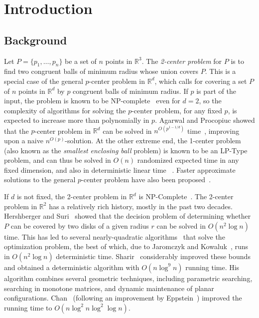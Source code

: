 \documentclass[a4paper,12pt]{article}
\def\reals{\mathbb{R}}
\begin{document}
\section{Introduction}
\label{sec:introduction}

\subsection{Background}
\label{subsec:background} Let $P = \{p_1,\ldots,p_n\}$ be a set of
$n$ points in $\reals^3$. The \emph{2-center problem} for $P$ is to
find two congruent balls of minimum radius whose union covers $P$.
This is a special case of the general $p$-center problem in
$\reals^d$, which calls for covering a set $P$ of $n$ points in
$\mathbb{R}^d$ by $p$ congruent balls of minimum radius. If $p$ is
part of the input, the problem is known to be NP-complete~\cite{MK}
even for $d=2$, so the complexity of algorithms for solving the
$p$-center problem, for any fixed $p$, is expected to increase more
than polynomially in $p$. Agarwal and Procopiuc showed that the
$p$-center problem in $\reals^d$ can be solved in $n^{O(p^{1-1/d})}$
time~\cite{AP}, improving upon a naive $n^{O(p)}$-solution. At the
other extreme end, the 1-center problem (also known as the
\emph{smallest enclosing ball} problem) is known to be an LP-Type
problem, and can thus be solved in $O(n)$ randomized expected time
in any fixed dimension, and also in deterministic linear time
~\cite{CM, NML, NMLT}. Faster approximate solutions to the general
$p$-center problem have also been proposed~\cite{AP, BHI, BE}.

If $d$ is not fixed, the 2-center problem in $\reals^d$ is
NP-Complete~\cite{MK2}. The 2-center problem in $\reals^2$ has a
relatively rich history, mostly in the past two decades. Hershberger
and Suri~\cite{HS} showed that the decision problem of determining
whether $P$ can be covered by two disks of a given radius $r$ can be
solved in $O(n^2 \log n)$ time. This has led to several
nearly-quadratic algorithms~\cite{ASP, DE, JK} that solve the
optimization problem, the best of which, due to Jaromczyk and
Kowaluk~\cite{JK}, runs in $O(n^2 \log n)$ deterministic time.
Sharir~\cite{MS} considerably improved these bounds and obtained a
deterministic algorithm with $O(n \log^9 n)$ running time. His
algorithm combines several geometric techniques, including
parametric searching, searching in monotone matrices, and dynamic
maintenance of planar configurations. Chan~\cite{TC} (following an
improvement by Eppstein~\cite{DEF}) improved the running time to
$O(n \log^2 n \log^2 \log n)$.
\end{document}
